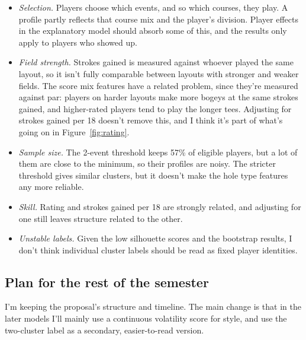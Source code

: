 \documentclass[10pt]{article}
\begin{document}
\begin{itemize}
  \item \emph{Selection.} Players choose which events, and so which courses, they play. A profile partly reflects that course mix and the player's division. Player effects in the explanatory model should absorb some of this, and the results only apply to players who showed up.
  \item \emph{Field strength.} Strokes gained is measured against whoever played the same layout, so it isn't fully comparable between layouts with stronger and weaker fields. The score mix features have a related problem, since they're measured against par: players on harder layouts make more bogeys at the same strokes gained, and higher-rated players tend to play the longer tees. Adjusting for strokes gained per 18 doesn't remove this, and I think it's part of what's going on in Figure~\ref{fig:rating}.
  \item \emph{Sample size.} The 2-event threshold keeps 57\% of eligible players, but a lot of them are close to the minimum, so their profiles are noisy. The stricter threshold gives similar clusters, but it doesn't make the hole type features any more reliable.
  \item \emph{Skill.} Rating and strokes gained per 18 are strongly related, and adjusting for one still leaves structure related to the other.
  \item \emph{Unstable labels.} Given the low silhouette scores and the bootstrap results, I don't think individual cluster labels should be read as fixed player identities.
\end{itemize}

\subsection{Plan for the rest of the semester}

I'm keeping the proposal's structure and timeline. The main change is that in the later models I'll mainly use a continuous volatility score for style, and use the two-cluster label as a secondary, easier-to-read version.
\end{document}
